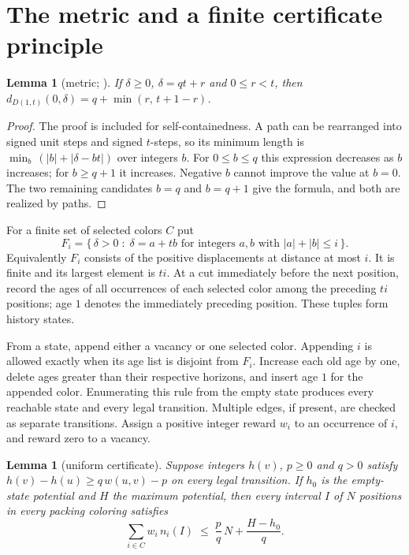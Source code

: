 \documentclass[11pt,reqno]{amsart}
\theoremstyle{plain}
\newtheorem{lemma}[theorem]{Lemma}
\newcommand{\D}[1]{D(1,#1)}
\theoremstyle{plain}
\theoremstyle{plain}
\begin{document}
\section{The metric and a finite certificate principle}\label{M-sec:certificate-principle}

\begin{lemma}[metric; {\cite[Lemma~1]{M-Togni14}}]\label{M-lem:metric}
If $\delta \ge 0$, $\delta = qt + r$ and $0 \le r < t$, then
$d_{\D{t}}(0,\delta) = q + \min(r,\,t+1-r)$.
\end{lemma}

\begin{proof}
The proof is included for self-containedness. A path can be rearranged into
signed unit steps and signed $t$-steps, so its
minimum length is $\min_b\,(|b| + |\delta - bt|)$ over integers $b$. For
$0 \le b \le q$ this expression decreases as $b$ increases; for $b \ge q+1$ it
increases. Negative $b$ cannot improve the value at $b = 0$. The two remaining
candidates $b = q$ and $b = q+1$ give the formula, and both are realized by
paths.
\end{proof}

For a finite set of selected colors $C$ put
\[
F_i = \{\,\delta > 0 \;:\; \delta = a + tb \text{ for integers } a,b
\text{ with } |a| + |b| \le i \,\}.
\]
Equivalently $F_i$ consists of the positive displacements at distance at most
$i$. It is finite and its largest element is $ti$. At a cut immediately before
the next position, record the ages of all occurrences of each selected color
among the preceding $ti$ positions; age $1$ denotes the immediately preceding
position. These tuples form history states.

From a state, append either a vacancy or one selected color. Appending $i$ is
allowed exactly when its age list is disjoint from $F_i$. Increase each old age
by one, delete ages greater than their respective horizons, and insert age $1$
for the appended color. Enumerating this rule from the empty state produces
every reachable state and every legal transition. Multiple edges, if present,
are checked as separate transitions. Assign a positive integer reward $w_i$ to
an occurrence of $i$, and reward zero to a vacancy.

\begin{lemma}[uniform certificate]\label{M-lem:cert}
Suppose integers $h(v)$, $p \ge 0$ and $q > 0$ satisfy
$h(v) - h(u) \ge q\,w(u,v) - p$ on every legal transition. If $h_0$ is the
empty-state potential and $H$ the maximum potential, then every interval $I$ of
$N$ positions in every packing coloring satisfies
\begin{equation}\label{M-eq:cert}
\sum_{i \in C} w_i\, n_i(I) \;\le\; \frac{p}{q}\,N + \frac{H - h_0}{q}.
\end{equation}
\end{lemma}
\end{document}
